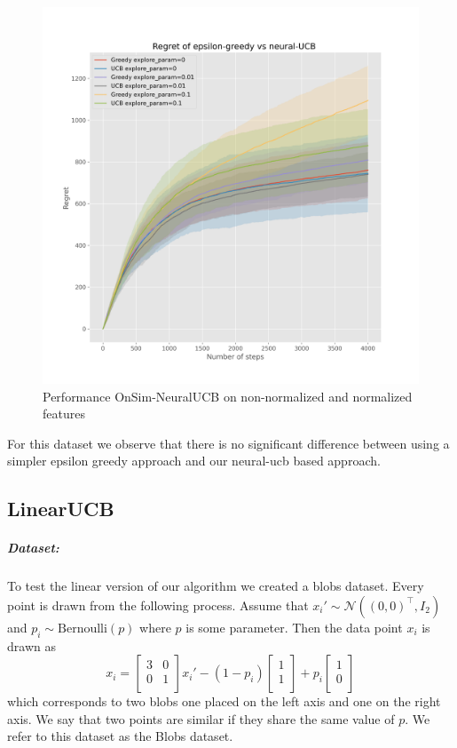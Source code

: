 \documentclass{article}
\begin{document}
\begin{figure}[!h]
\begin{minipage}{.45\textwidth}
    \includegraphics[width=\linewidth]{online-epsilon-vs-neural-reduced-normalized-ci}
  \end{minipage}
  \caption{Performance OnSim-NeuralUCB on non-normalized and normalized features}\label{fig:online-epsilon-vs-neural-ci}
\end{figure}

For this dataset we observe that there is no significant difference between using a simpler epsilon greedy approach
and our neural-ucb  based approach.
\subsection{LinearUCB}
\subparagraph{Dataset:}
To test the linear version of our algorithm we created a blobs dataset.
Every point is drawn from the following process. Assume that $x_i' \sim \mathcal{N}((0, 0)^\top,I_2)$ and $p_i \sim \text{Bernoulli}(p)$ where $p$ is
some parameter.
Then the data point $x_i$ is drawn as
\[x_i = \begin{bmatrix} 3 & 0\\ 0 & 1\\ \end{bmatrix} x_i' -(1-p_i)
\begin{bmatrix}
1\\
1\\
\end{bmatrix}
+ p_i
\begin{bmatrix}
1\\
0\\
\end{bmatrix}
\]
which corresponds to two blobs one placed on the left axis and one on the right axis.
We say that two points are similar if they share the same value of $p$.
We refer to this dataset as the Blobs dataset.
\end{document}
